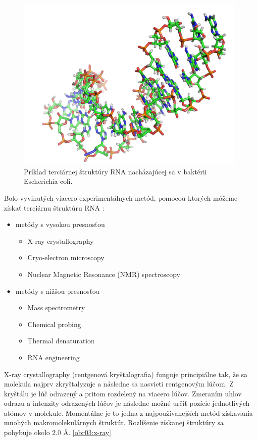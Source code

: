 \begin{figure}%
\includegraphics[width=\textwidth]{../img/ecoli_rna_example}
\caption{Príklad terciárnej štruktúry RNA nacházajúcej sa v baktérii Escherichia coli.}
\label{obr02:ecoli}
\end{figure}



\indent 
Bolo vyvinutých viacero experimentálnych metód, pomocou ktorých môžeme získať terciárnu štruktúru RNA \cite{Felden07}:
\begin{itemize}
\item metódy s vysokou presnosťou
\begin{itemize}
\item X-ray crystallography
\item Cryo-electron microscopy 
\item Nuclear Magnetic Resonance (NMR) spectroscopy
\end{itemize}
\item metódy s nižšou presnosťou
\begin{itemize}
\item Mass spectrometry
\item Chemical probing
\item Thermal denaturation
\item RNA engineering
\end{itemize}
\end{itemize}


\indent X-ray crystallography (rentgenová kryštalografia) funguje principiálne tak, že sa molekula najprv zkryštalyzuje a následne sa nasvieti rentgenovým lúčom. Z kryštálu je lúč odrazený a pritom rozdelený na viacero lúčov. Zmeraním uhlov odrazu a intenzity odrazených lúčov je následne možné určiť pozície jednotlivých atómov v molekule. Momentálne je to jedna z najpoužívanejších metód získavania mnohých makromolekulárnych štruktúr. Rozlíšenie získanej štruktúry sa pohybuje okolo 2.0 Å. \ref{obr03:x-ray}


